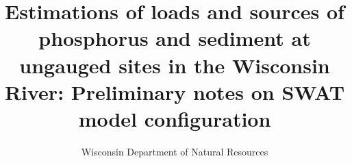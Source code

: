 \documentclass[10pt,letterpaper]{article}%
\author{Wisconsin Department of Natural Resources}
\title{Estimations of loads and sources of phosphorus and sediment at ungauged sites in the Wisconsin River: Preliminary notes on SWAT model configuration}
\begin{document}
\maketitle
\pagebreak

\tableofcontents
\pagebreak

\listoffigures
\pagebreak

\listoftables
\pagebreak







\end{document}
